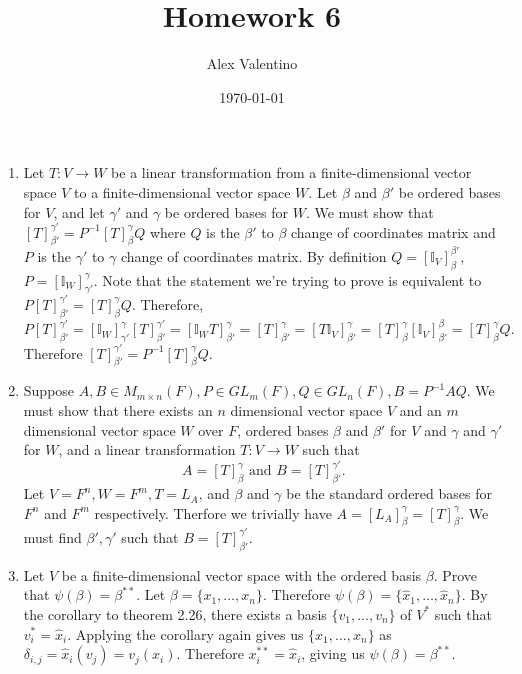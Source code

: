 \documentclass[12pt, letterpaper]{article}
\date{\today}
\author{Alex Valentino}
\title{Homework 6}
\begin{document}
	\begin{enumerate}
		\item Let $T: V \to W$ be a linear transformation from a finite-dimensional vector space $V$ to a finite-dimensional vector space $W$.  Let $
		\beta$ and $\beta'$ be ordered bases for $V$, and let $\gamma'$ and $\gamma$ be ordered bases for $W$.  We must show that $[T]^{\gamma'}_{\beta'} = P^{-1}[T]^\gamma_\beta Q$ where $Q$ is the $\beta'$ to $\beta$ change of coordinates matrix and $P$ is the $\gamma'$ to $\gamma$ change of coordinates matrix.  By definition $Q = [\mathbb{I}_V]^{\beta'}_\beta$, $P = [\mathbb{I}_W]^{\gamma}_{\gamma'}$.  Note that the statement we're trying to prove is equivalent to $P [T]^{\gamma'}_{\beta'} = [T]^\gamma_\beta Q$.  Therefore, 
		$$
					P [T]^{\gamma'}_{\beta'} = [\mathbb{I}_W]^{\gamma}_{\gamma'} [T]^{\gamma'}_{\beta'} = [\mathbb{I}_W T]^\gamma_{\beta'} = [T]^\gamma_{\beta'} = [T \mathbb{I}_V]^\gamma_{\beta'} = [T]^{\gamma}_\beta [\mathbb{I}_V]^{\beta}_{\beta'} = [T]^\gamma_\beta Q.
		$$  
		Therefore $[T]^{\gamma'}_{\beta'} = P^{-1}[T]^\gamma_\beta Q$. 
		
		\newpage
		\item Suppose $A,B \in M_{m \times n}(F), P \in GL_m (F), Q \in GL_n (F), B = P^{-1} A Q$.  We must show that there exists an $n$ dimensional vector space $V$ and an $m$ dimensional vector space $W$ over $F$, ordered bases $\beta$ and $\beta'$ for $V$ and $\gamma$ and $\gamma'$ for $W$, and a linear transformation $T: V \to W$ such that $$A = [T]^{\gamma}_\beta \text{ and } B = [T]^{\gamma'}_{\beta'}.$$
		Let $V = F^n, W= F^m, T = L_A$, and $\beta$ and $\gamma$ be the standard ordered bases for $F^n$ and $F^m$ respectively.  Therfore we trivially have $A = [L_A]^{\gamma}_{\beta} = [T]^{\gamma}_{\beta}$.  We must find $\beta', \gamma'$ such that $B = [T]_{\beta'}^{\gamma'}$.  
		
		
		\newpage
		\item Let $V$ be a finite-dimensional vector space with the ordered basis $\beta$.  Prove that $\psi(\beta) = \beta^{**}$.
			Let $\beta = \{x_1,\ldots,x_n\}$.  Therefore $\psi (\beta) = \{\hat{x}_1,\ldots,\hat{x}_n\}$.  By the corollary to theorem 2.26, there exists a basis $\{v_1,\ldots,v_n\}$ of $V^*$ such that $v^*_i = \hat{x}_i$.  Applying the corollary again gives us $\{x_1,\ldots,x_n\}$ as $\delta_{i,j} = \hat{x}_i (v_j) = v_j(x_i)$.  Therefore $x_i^{**} = \hat{x}_i$, giving us $\psi(\beta) = \beta^{**}$.
		\newpage
		

\end{enumerate}
\end{document}
